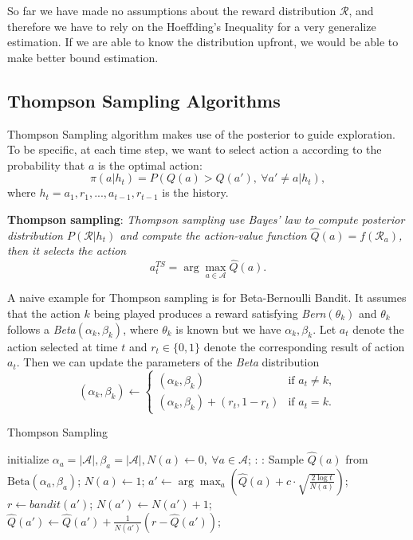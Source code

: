 \documentclass{progartcn}
\begin{document}
    	So far we have made no assumptions about the reward distribution $\mathcal{R}$, and therefore we have to rely on the Hoeffding's Inequality for a very generalize estimation. If we are able to know the distribution upfront, we would be able to make better bound estimation.

    \subsection{Thompson Sampling Algorithms}

    	Thompson Sampling algorithm makes use of the posterior to guide exploration. To be specific, at each time step, we want to select action a according to the probability that $a$ is the optimal action:
    	\[\pi(a|h_t)=P(Q(a)>Q(a'),\ \forall a'\ne a|h_t),\]
    	where $h_t=a_1,r_1,...,a_{t-1},r_{t-1}$ is the history.

    	\textbf{Thompson sampling}: \textit{Thompson sampling use Bayes' law to compute posterior distribution $P(\mathcal{R}|h_t)$ and compute the action-value function $\hat{Q}(a)=f(\mathcal{R}_a)$, then it selects the action}
    	\[a_t^{TS}=\arg\max_{a\in \mathcal{A}} \hat{Q}(a).\]

    	A naive example for Thompson sampling is for Beta-Bernoulli Bandit. It assumes that the action $k$ being played produces a reward satisfying \textit{Bern}$(\theta_k)$ and $\theta_k$ follows a \textit{Beta}$(\alpha_k,\beta_k)$, where $\theta_k$ is known but we have $\alpha_k,\beta_k$. Let $a_t$ denote the action selected at time $t$ and $r_t\in\{0,1\}$ denote the corresponding result of action $a_t$. Then we can update the parameters of the \textit{Beta} distribution
    	\[(\alpha_k,\beta_k)\gets\begin{cases}(\alpha_k,\beta_k) &\text{if } a_t\ne k,\\ (\alpha_k,\beta_k)+(r_t,1-r_t) &\text{if } a_t=k.\end{cases}\]

    	\begin{algorithm}[H]
		\caption{Thompson Sampling}
		\label{alg: ts}
		\begin{algorithmic}[1]
			\State initialize $\alpha_a = |\mathcal{A}|,\beta_a=|\mathcal{A}|, N(a)\gets0,\ \forall a\in\mathcal{A}$;
			:
			:
				\State Sample $\hat{Q}(a)$ from $\text{Beta}(\alpha_a,\beta_a)$;
				\State $N(a)\gets1$;
			\EndFor
				\State $a'\gets\arg\max_{a} \left(\hat{Q}(a)+c\cdot\sqrt{\frac{2\log t}{N(a)}}\right)$;
				\State $r\gets bandit(a')$;
				\State $N(a')\gets N(a')+1$;
				\State $\hat{Q}(a')\gets \hat{Q}(a')+\frac{1}{N(a')}(r-\hat{Q}(a'))$;
        	\EndFor
		\end{algorithmic}
		\end{algorithm}
\end{document}
